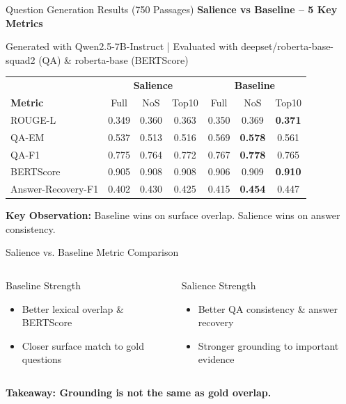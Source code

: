 \documentclass[aspectratio=169]{beamer}
\begin{document}
\begin{frame}{Question Generation Results (750 Passages)}
\centering
\textbf{Salience vs Baseline -- 5 Key Metrics}

\scriptsize Generated with Qwen2.5-7B-Instruct | Evaluated with deepset/roberta-base-squad2 (QA) \& roberta-base (BERTScore)

\vspace{0.2em}
\small
\begin{tabular}{l|ccc|ccc}
\toprule
& \multicolumn{3}{c|}{\textbf{Salience}} & \multicolumn{3}{c}{\textbf{Baseline}} \\
\textbf{Metric} & Full & NoS & Top10 & Full & NoS & Top10 \\
\midrule
ROUGE-L & 0.349 & 0.360 & 0.363 & 0.350 & 0.369 & \textbf{0.371} \\
QA-EM & 0.537 & 0.513 & 0.516 & 0.569 & \textbf{0.578} & 0.561 \\
QA-F1 & 0.775 & 0.764 & 0.772 & 0.767 & \textbf{0.778} & 0.765 \\
BERTScore & 0.905 & 0.908 & 0.908 & 0.906 & 0.909 & \textbf{0.910} \\
Answer-Recovery-F1 & 0.402 & 0.430 & 0.425 & 0.415 & \textbf{0.454} & 0.447 \\
\bottomrule
\end{tabular}

\vspace{0.3em}
\textbf{Key Observation:} Baseline wins on surface overlap. Salience wins on answer consistency.
\end{frame}

\begin{frame}{Salience vs. Baseline Metric Comparison}
\small
\begin{columns}[T,onlytextwidth]
\begin{block}{Baseline Strength}
\begin{itemize}
  \item Better lexical overlap \& BERTScore
  \item Closer surface match to gold questions
\end{itemize}
\end{block}

\begin{alertblock}{Salience Strength}
\begin{itemize}
  \item Better QA consistency \& answer recovery
  \item Stronger grounding to important evidence
\end{itemize}
\end{alertblock}
\end{columns}

\vspace{0.5em}
\centering\textbf{Takeaway: Grounding is not the same as gold overlap.}
\end{frame}
\end{document}
